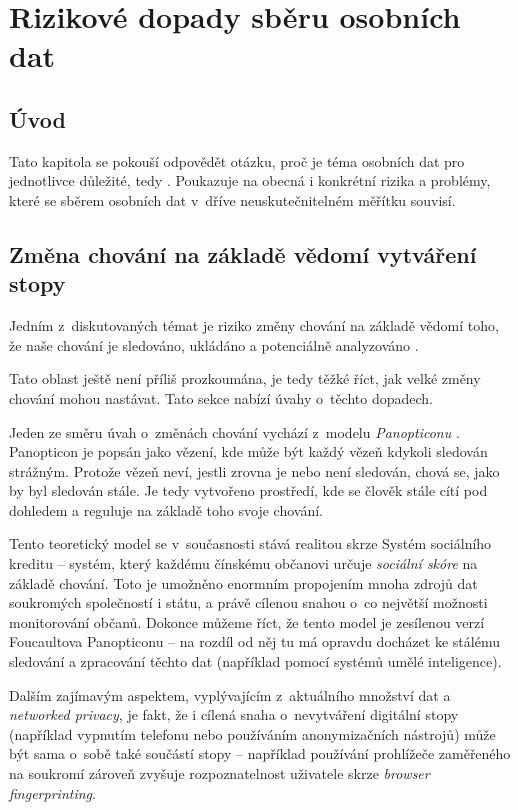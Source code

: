 \chapter{Rizikové dopady sběru osobních dat}

\section*{Úvod}
Tato kapitola se pokouší odpovědět otázku, proč je téma osobních dat pro jednotlivce důležité, tedy . Poukazuje na obecná i konkrétní rizika a problémy, které se sběrem osobních dat v~dříve neuskutečnitelném měřítku souvisí. 


\section{Změna chování na základě vědomí vytváření stopy}

Jedním z~diskutovaných témat je riziko změny chování na základě vědomí toho, že naše chování je sledováno, ukládáno a potenciálně analyzováno \citep{behavior-changes}.

Tato oblast ještě není příliš prozkoumána, je tedy těžké říct, jak velké změny chování mohou nastávat. Tato sekce nabízí úvahy o~těchto dopadech.

Jeden ze směru úvah o~změnách chování vychází z~modelu \textit{Panopticonu} \citep{panopticon}. Panopticon je popsán jako vězení, kde může být každý vězeň kdykoli sledován strážným. Protože vězeň neví, jestli zrovna je nebo není sledován, chová se, jako by byl sledován stále. Je tedy vytvořeno prostředí, kde se člověk stále cítí pod dohledem a reguluje na základě toho svoje chování.

Tento teoretický model se v~současnosti stává realitou skrze Systém sociálního kreditu -- systém, který každému čínskému občanovi určuje \textit{sociální skóre} na základě chování. Toto je umožněno enormním propojením mnoha zdrojů dat soukromých společností i státu, a právě cílenou snahou o~co největší možnosti monitorování občanů. Dokonce můžeme říct, že tento model je zesílenou verzí Foucaultova Panopticonu -- na rozdíl od něj tu má opravdu docházet ke stálému sledování a zpracování těchto dat (například pomocí systémů umělé inteligence).

Dalším zajímavým aspektem, vyplývajícím z~aktuálního množství dat a \textit{networked privacy}, je fakt, že i cílená snaha o~nevytváření digitální stopy (například vypnutím telefonu nebo používáním anonymizačních nástrojů) může být sama o~sobě také součástí stopy -- například používání prohlížeče zaměřeného na soukromí zároveň zvyšuje rozpoznatelnost uživatele skrze \textit{browser fingerprinting}.


